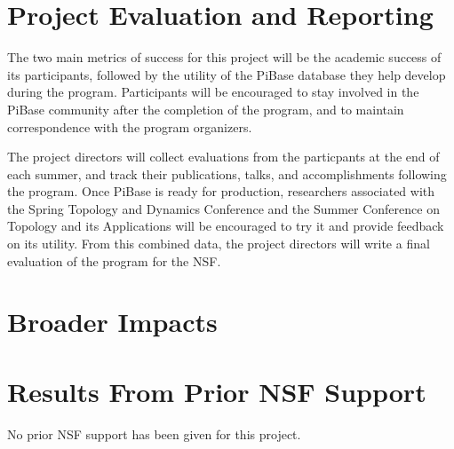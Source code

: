 \section{Project Evaluation and Reporting}

The two main metrics of success for this project will be the academic success
of its participants, followed by the utility of the PiBase database they help
develop during the program. Participants will be encouraged to stay involved
in the PiBase community after the completion of the program, and to maintain
correspondence with the program organizers.

The project directors will collect evaluations from the particpants at the end
of each summer, and track their publications, talks, and
accomplishments following the program. Once PiBase is ready for production,
researchers associated with the Spring Topology and Dynamics Conference
and the Summer Conference on Topology and its Applications
will be encouraged to try it and provide feedback on its utility. From this
combined data, the project directors will write a final evaluation of the
program for the NSF.

\section{Broader Impacts}

\section{Results From Prior NSF Support}

No prior NSF support has been given for this project.
